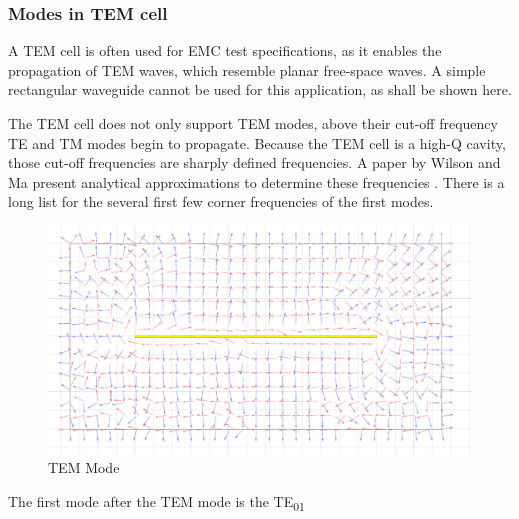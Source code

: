 \subsubsection{Modes in TEM cell}

A TEM cell is often used for EMC test specifications, as it enables the propagation of TEM waves, which resemble planar free-space waves. A simple rectangular waveguide cannot be used for this application, as shall be shown here. %

The TEM cell does not only support TEM modes, above their cut-off frequency TE and TM modes begin to propagate. Because the TEM cell is a high-Q cavity, those cut-off frequencies are sharply defined frequencies. A paper by Wilson and Ma present analytical approximations to determine these frequencies \cite{Wilson_Ma_1986}.  There is a long list for the several first few corner frequencies of the first modes.

\begin{figure}[h]
    \centering
    \includegraphics[width=0.5\linewidth]{images/tem_mode.png}
    \caption{TEM Mode}
    \label{fig:tem_mode}
\end{figure}

The first mode after the TEM mode is the TE\textsubscript{01}

